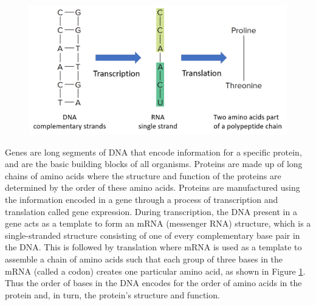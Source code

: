 \begin{figure}
  \centering
  \includegraphics[width=.75\linewidth]{images/ch_2_protein_generation.PNG}
  \label{fig:ch_2_protein_generation}
\end{figure}


Genes are long segments of DNA that encode information for a specific protein, and are the basic building blocks of all organisms. Proteins are made up of long chains of amino acids where the structure and function of the proteins are determined by the order of these amino acids. Proteins are manufactured using the information encoded in a gene through a process of transcription and translation called gene expression. During transcription, the DNA present in a gene acts as a template to form an mRNA (messenger RNA) structure, which is a single-stranded structure consisting of one of every complementary base pair in the DNA. This is followed by translation where mRNA is used as a template to assemble a chain of amino acids such that each group of three bases in the mRNA (called a codon) creates one particular amino acid, as shown in Figure \ref{fig:ch_2_protein_generation}. Thus the order of bases in the DNA encodes for the order of amino acids in the protein and, in turn, the protein's structure and function\cite{clancy2008translation}.

